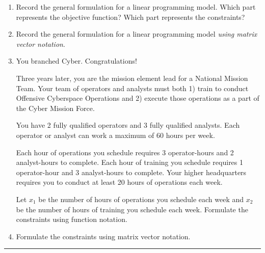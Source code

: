 \documentclass[11pt]{article}
\begin{document}



\begin{enumerate}

\item Record the general formulation for a linear programming model. Which part represents the objective function? Which part represents the constraints?

\vfill

\item Record the general formulation for a linear programming model \textit{using matrix vector notation}.

\vfill

\item You branched Cyber. Congratulations! 

Three years later, you are the mission element lead for a National Mission Team. 
Your team of operators and analysts must both 1) train to conduct Offensive Cyberspace Operations and 2) execute those operations as a part of the Cyber Mission Force.

You have 2 fully qualified operators and 3 fully qualified analysts.
Each operator or analyst can work a maximum of 60 hours per week.

Each hour of operations you schedule requires 3 operator-hours and 2 analyst-hours to complete. 
Each hour of training you schedule requires 1 operator-hour and 3 analyst-hours to complete. 
Your higher headquarters requires you to conduct at least 20 hours of operations each week.

Let $x_1$ be the number of hours of operations you schedule each week and $x_2$ be the number of hours of training you schedule each week.
Formulate the constraints using function notation. 

\vfill

\item Formulate the constraints using matrix vector notation.

\vfill

\end{enumerate}

\newpage

\hrule
\end{document}
